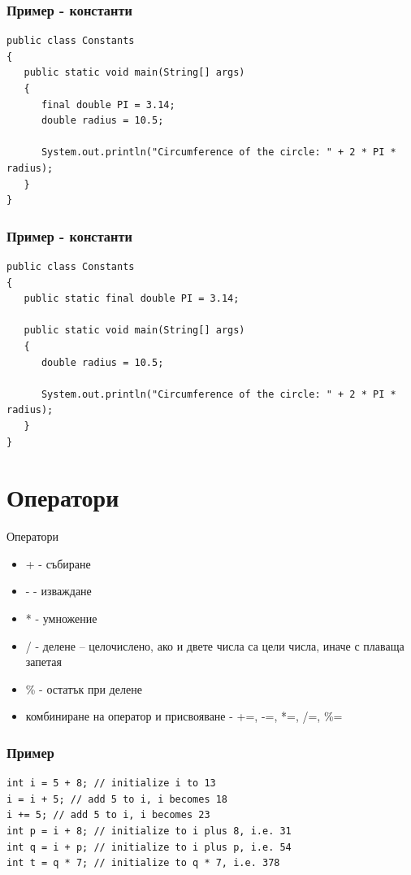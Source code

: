 \documentclass{beamer}
\begin{document}
\begin{frame}[fragile]
  \frametitle{Пример - константи}
  \transdissolve
\begin{lstlisting}
public class Constants
{
   public static void main(String[] args)
   {
      final double PI = 3.14;
      double radius = 10.5;

      System.out.println("Circumference of the circle: " + 2 * PI * radius);
   }
}
\end{lstlisting}
\end{frame}

\begin{frame}[fragile]
  \frametitle{Пример - константи}
  \transdissolve
\begin{lstlisting}
public class Constants
{
   public static final double PI = 3.14;

   public static void main(String[] args)
   {
      double radius = 10.5;

      System.out.println("Circumference of the circle: " + 2 * PI * radius);
   }
}
\end{lstlisting}
\end{frame}

\section{Оператори}
\begin{frame}{Оператори}
  \transdissolve
  \begin{itemize}
  \item + - събиране \pause
  \item - - изваждане \pause
  \item * - умножение \pause
  \item / - делене – целочислено, ако и двете
    числа са цели числа, иначе с плаваща
    запетая \pause
  \item \% - остатък при делене \pause
  \item комбиниране на оператор и присвояване - +=, -=, *=, /=, \%=
  \end{itemize}
\end{frame}

\begin{frame}[fragile]
  \frametitle{Пример}
  \transdissolve
\begin{lstlisting}
int i = 5 + 8; // initialize i to 13
i = i + 5; // add 5 to i, i becomes 18
i += 5; // add 5 to i, i becomes 23
int p = i + 8; // initialize to i plus 8, i.e. 31
int q = i + p; // initialize to i plus p, i.e. 54
int t = q * 7; // initialize to q * 7, i.e. 378
\end{lstlisting}
\end{frame}
\end{document}
